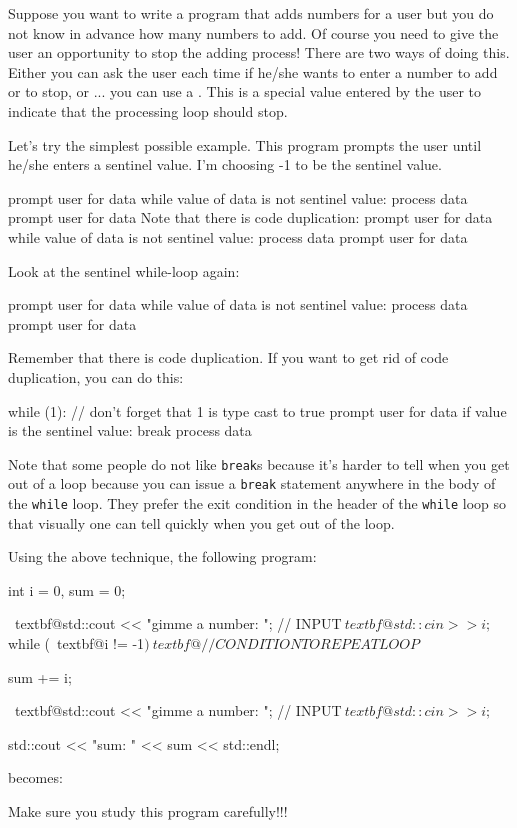 Suppose you want to write a program that adds numbers for a user but you
do not know in advance how many numbers to add. Of course you need to
give the user an opportunity to stop the adding process! There are two
ways of doing this. Either you can ask the user each time if he/she
wants to enter a number to add or to stop, or ... you can use a
. This is a special value entered by the user to
indicate that the processing loop should stop.

Let's try the simplest possible example. This program
prompts the user until he/she enters a sentinel value.
I'm choosing -1 to be the sentinel value.


prompt user for data
while value of data is not sentinel value:
process data
prompt user for data
Note that there is code duplication:
prompt user for data
while value of data is not sentinel value:
process data
prompt user for data


Look at the sentinel while-loop again:

prompt user for data
while value of data is not sentinel value:
process data
prompt user for data

Remember that there is code duplication. If you want to get rid of code
duplication, you can do this:

while (1): // don't forget that 1 is type cast to true
prompt user for data
if value is the sentinel value:
break
process data

Note that some people do not like \texttt{break}s because
it's harder to tell when you get out of a loop because
you can issue a \texttt{break} statement anywhere in the body of the
\texttt{while} loop. They prefer the exit condition in the header of the
\texttt{while} loop so that visually one can tell quickly when you get out
of the loop.

Using the above technique, the following program:

\begin{console}[commandchars=\~\@\$]
int i = 0, sum = 0;

~textbf@std::cout << "gimme a number: "; // INPUT$
~textbf@std::cin >> i;$
while (~textbf@i != -1$) ~textbf@// CONDITION TO REPEAT LOOP$
{     
      sum += i;
      
      ~textbf@std::cout << "gimme a number: "; // INPUT$
      ~textbf@std::cin >> i;$
}
std::cout << "sum: " << sum << std::endl;
\end{console}
becomes:
Make sure you study this program carefully!!!


